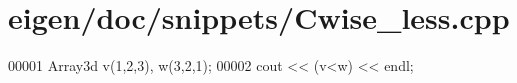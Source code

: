 \hypertarget{eigen_2doc_2snippets_2_cwise__less_8cpp_source}{}\section{eigen/doc/snippets/\+Cwise\+\_\+less.cpp}
\label{eigen_2doc_2snippets_2_cwise__less_8cpp_source}

\begin{DoxyCode}
00001 Array3d v(1,2,3), w(3,2,1);
00002 cout << (v<w) << endl;
\end{DoxyCode}
